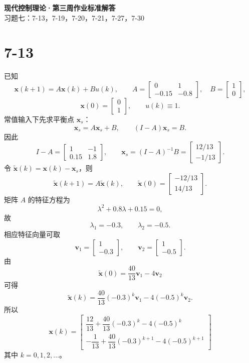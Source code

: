 \documentclass[UTF8,a4paper,11pt]{ctexart}
\begin{document}
\begin{center}
{\LARGE\bfseries 现代控制理论·第三周作业标准解答}\\[4pt]
{\large 习题七：7-13，7-19，7-20，7-21，7-27，7-30}
\end{center}

\section*{7-13}
已知
\[
\bm x(k+1)=A\bm x(k)+B u(k),\qquad
A=\begin{bmatrix}0&1\\-0.15&-0.8\end{bmatrix},\quad
B=\begin{bmatrix}1\\0\end{bmatrix},
\]
\[
\bm x(0)=\begin{bmatrix}0\\1\end{bmatrix},\qquad u(k)\equiv1.
\]
常值输入下先求平衡点 $\bm x_s$：
\[
\bm x_s=A\bm x_s+B,\qquad (I-A)\bm x_s=B.
\]
因此
\[
I-A=\begin{bmatrix}1&-1\\0.15&1.8\end{bmatrix},\qquad
\bm x_s=(I-A)^{-1}B
=\begin{bmatrix}12/13\\-1/13\end{bmatrix}.
\]
令 $\tilde{\bm x}(k)=\bm x(k)-\bm x_s$，则
\[
\tilde{\bm x}(k+1)=A\tilde{\bm x}(k),\qquad
\tilde{\bm x}(0)=
\begin{bmatrix}-12/13\\14/13\end{bmatrix}.
\]
矩阵 $A$ 的特征方程为
\[
\lambda^2+0.8\lambda+0.15=0,
\]
故
\[
\lambda_1=-0.3,\qquad \lambda_2=-0.5.
\]
相应特征向量可取
\[
\bm v_1=\begin{bmatrix}1\\-0.3\end{bmatrix},\qquad
\bm v_2=\begin{bmatrix}1\\-0.5\end{bmatrix}.
\]
由
\[
\tilde{\bm x}(0)=\frac{40}{13}\bm v_1-4\bm v_2
\]
可得
\[
\tilde{\bm x}(k)=\frac{40}{13}(-0.3)^k\bm v_1-4(-0.5)^k\bm v_2.
\]
所以
\[
\boxed{
\bm x(k)=
\begin{bmatrix}
\dfrac{12}{13}+\dfrac{40}{13}(-0.3)^k-4(-0.5)^k\\[8pt]
-\dfrac{1}{13}+\dfrac{40}{13}(-0.3)^{k+1}-4(-0.5)^{k+1}
\end{bmatrix}}
\]
其中 $k=0,1,2,\ldots$。
\end{document}
